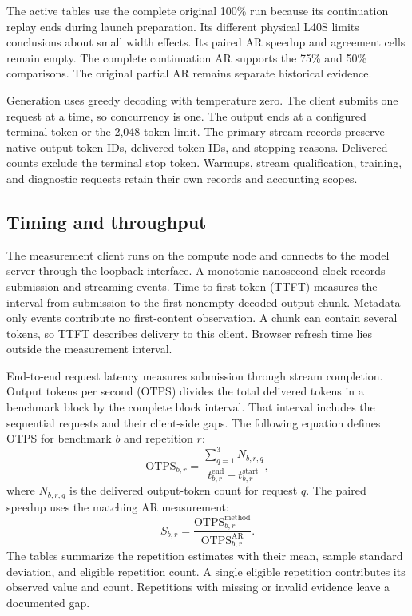 \documentclass[conference,onecolumn]{IEEEtran}
\begin{document}
The active tables use the complete original 100\% run because its continuation replay ends during launch preparation. Its different physical L40S limits conclusions about small width effects. Its paired AR speedup and agreement cells remain empty. The complete continuation AR supports the 75\% and 50\% comparisons. The original partial AR remains separate historical evidence.

Generation uses greedy decoding with temperature zero. The client submits one request at a time, so concurrency is one. The output ends at a configured terminal token or the 2,048-token limit. The primary stream records preserve native output token IDs, delivered token IDs, and stopping reasons. Delivered counts exclude the terminal stop token. Warmups, stream qualification, training, and diagnostic requests retain their own records and accounting scopes.

\subsection{Timing and throughput}
The measurement client runs on the compute node and connects to the model server through the loopback interface. A monotonic nanosecond clock records submission and streaming events. Time to first token (TTFT) measures the interval from submission to the first nonempty decoded output chunk. Metadata-only events contribute no first-content observation. A chunk can contain several tokens, so TTFT describes delivery to this client. Browser refresh time lies outside the measurement interval.

End-to-end request latency measures submission through stream completion. Output tokens per second (OTPS) divides the total delivered tokens in a benchmark block by the complete block interval. That interval includes the sequential requests and their client-side gaps. The following equation defines OTPS for benchmark $b$ and repetition $r$:
\begin{equation}
\mathrm{OTPS}_{b,r} =
\frac{\sum_{q=1}^{3} N_{b,r,q}}
{t^{\mathrm{end}}_{b,r}-t^{\mathrm{start}}_{b,r}},
\end{equation}
where $N_{b,r,q}$ is the delivered output-token count for request $q$. The paired speedup uses the matching AR measurement:
\begin{equation}
S_{b,r}=\frac{\mathrm{OTPS}^{\mathrm{method}}_{b,r}}
{\mathrm{OTPS}^{\mathrm{AR}}_{b,r}}.
\end{equation}
The tables summarize the repetition estimates with their mean, sample standard deviation, and eligible repetition count. A single eligible repetition contributes its observed value and count. Repetitions with missing or invalid evidence leave a documented gap.
\end{document}
